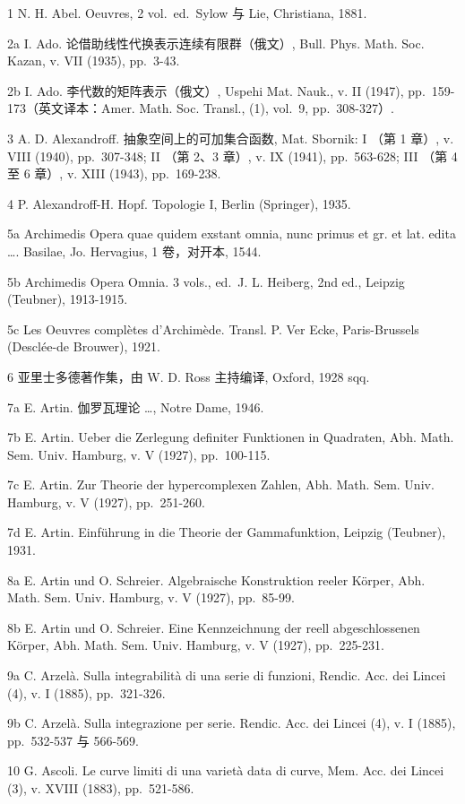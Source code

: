 
1 N. H. Abel. Oeuvres, 2 vol.~ed.~Sylow 与 Lie, Christiana, 1881.

2a I. Ado. 论借助线性代换表示连续有限群（俄文）, Bull. Phys. Math. Soc. Kazan, v. VII (1935), pp.~3-43.

2b I. Ado. 李代数的矩阵表示（俄文）, Uspehi Mat. Nauk., v. II (1947), pp.~159-173（英文译本：Amer. Math. Soc. Transl., (1), vol.~9, pp.~308-327）.

3 A. D. Alexandroff. 抽象空间上的可加集合函数, Mat. Sbornik: I （第 1 章）, v. VIII (1940), pp.~307-348; II （第 2、3 章）, v. IX (1941), pp.~563-628; III （第 4 至 6 章）, v. XIII (1943), pp.~169-238.

4 P. Alexandroff-H. Hopf. Topologie I, Berlin (Springer), 1935.

5a Archimedis Opera quae quidem exstant omnia, nunc primus et gr. et lat. edita \ldots. Basilae, Jo. Hervagius, 1 卷，对开本, 1544.

5b Archimedis Opera Omnia. 3 vols., ed.~J. L. Heiberg, 2nd ed., Leipzig (Teubner), 1913-1915.

5c Les Oeuvres complètes d'Archimède. Transl. P. Ver Ecke, Paris-Brussels (Desclée-de Brouwer), 1921.

6 亚里士多德著作集，由 W. D. Ross 主持编译, Oxford, 1928 sqq.

7a E. Artin. 伽罗瓦理论 \ldots, Notre Dame, 1946.

7b E. Artin. Ueber die Zerlegung definiter Funktionen in Quadraten, Abh. Math. Sem. Univ. Hamburg, v. V (1927), pp.~100-115.

7c E. Artin. Zur Theorie der hypercomplexen Zahlen, Abh. Math. Sem. Univ. Hamburg, v. V (1927), pp.~251-260.

7d E. Artin. Einführung in die Theorie der Gammafunktion, Leipzig (Teubner), 1931.

8a E. Artin und O. Schreier. Algebraische Konstruktion reeler Körper, Abh. Math. Sem. Univ. Hamburg, v. V (1927), pp.~85-99.

8b E. Artin und O. Schreier. Eine Kennzeichnung der reell abgeschlossenen Körper, Abh. Math. Sem. Univ. Hamburg, v. V (1927), pp.~225-231.

9a C. Arzelà. Sulla integrabilità di una serie di funzioni, Rendic. Acc. dei Lincei (4), v. I (1885), pp.~321-326.

9b C. Arzelà. Sulla integrazione per serie. Rendic. Acc. dei Lincei (4), v. I (1885), pp.~532-537 与 566-569.

10 G. Ascoli. Le curve limiti di una varietà data di curve, Mem. Acc. dei Lincei (3), v. XVIII (1883), pp.~521-586.

